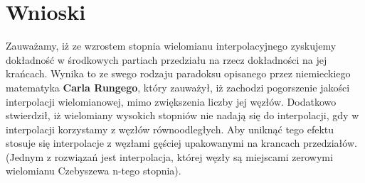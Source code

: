 \documentclass[a4paper,14pt]{report}
\begin{document}
  \section{Wnioski}
    Zauważamy, iż ze wzrostem stopnia wielomianu interpolacyjnego zyskujemy dokładność w środkowych partiach przedziału na rzecz dokładności na jej krańcach. Wynika to ze swego rodzaju paradoksu opisanego przez niemieckiego matematyka \textbf{Carla Rungego}, który zauważył, iż zachodzi pogorszenie jakości interpolacji wielomianowej, mimo zwiększenia liczby jej węzłów. Dodatkowo stwierdził, iż wielomiany wysokich stopniów nie nadają się do interpolacji, gdy w interpolacji korzystamy z węzłów równoodległych. Aby uniknąć tego efektu stosuje się interpolacje z węzłami gęściej upakowanymi na krancach przedziałów. (Jednym z rozwiązań jest interpolacja, której węzły są miejscami zerowymi wielomianu Czebyszewa n-tego stopnia).  
\end{document}
